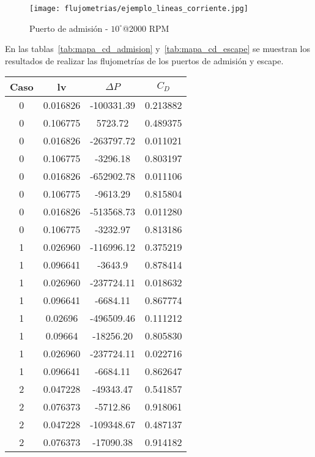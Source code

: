 \begin{figure}
    \centering
    \texttt{[image: flujometrias/ejemplo\_lineas\_corriente.jpg]}
    \caption{Puerto de admisión - $10^{\circ}$@2000 RPM}\label{fig:admision_10_2000.jpg}
\end{figure}

En las tablas~\ref{tab:mapa_cd_admision} y~\ref{tab:mapa_cd_escape} se muestran los
resultados de realizar las flujometrías de los puertos de admisión y escape.

\begin{table}
  \centering
    \begin{tabular}{cccc} \toprule
      Caso  & lv        & $\Delta P$    & $C_{D}$   \\ \midrule
      0     & 0.016826  & -100331.39    &  0.213882 \\
      0     & 0.106775  & 5723.72       &  0.489375 \\
      0     & 0.016826  & -263797.72    &  0.011021 \\
      0     & 0.106775  & -3296.18      &  0.803197 \\
      0     & 0.016826  & -652902.78    &  0.011106 \\
      0     & 0.106775  & -9613.29      &  0.815804 \\
      0     & 0.016826  & -513568.73    &  0.011280 \\
      0     & 0.106775  & -3232.97      &  0.813186 \\
      1     & 0.026960  & -116996.12    &  0.375219 \\
      1     & 0.096641  & -3643.9       &  0.878414 \\
      1     & 0.026960  & -237724.11    &  0.018632 \\
      1     & 0.096641  & -6684.11      &  0.867774 \\
      1     &  0.02696  & -496509.46    &  0.111212 \\
      1     &  0.09664  & -18256.20     &  0.805830 \\
      1     & 0.026960  & -237724.11    &  0.022716 \\
      1     & 0.096641  & -6684.11      &  0.862647 \\
      2     & 0.047228  & -49343.47     &  0.541857 \\
      2     & 0.076373  & -5712.86      &  0.918061 \\
      2     & 0.047228  & -109348.67    &  0.487137 \\
      2     & 0.076373  & -17090.38     &  0.914182 \\

\end{tabular}
\end{table}
